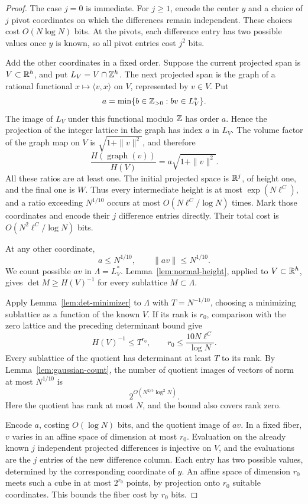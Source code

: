 \begin{proof}
The case \(j=0\) is immediate. For \(j\ge1\), encode the center \(y\)
and a choice of \(j\) pivot coordinates on which the differences remain
independent. These choices cost \(O(N\log N)\) bits. At the pivots,
each difference entry has two possible values once \(y\) is known, so
all pivot entries cost \(j^2\) bits.

Add the other coordinates in a fixed order. Suppose the current
projected span is \(V\subset\mathbb R^h\), and put \(L_V=V\cap\mathbb Z^h\). The next
projected span is the graph of a rational functional
\(x\mapsto\langle v,x\rangle\) on \(V\), represented by \(v\in V\). Put
\[
 a=\min\{b\in\mathbb Z_{>0}:bv\in L_V^*\}.
\]
The image of \(L_V\) under this functional modulo \(\mathbb Z\) has order
\(a\). Hence the projection of the integer lattice in the graph has
index \(a\) in \(L_V\). The volume factor of the graph map on \(V\) is
\(\sqrt{1+\|v\|^2}\), and therefore
\begin{equation}\label{eq:cube-height-ratio}
 \frac{H(\operatorname{graph}(v))}{H(V)}
       =a\sqrt{1+\|v\|^2}.
\end{equation}
All these ratios are at least one. The initial projected space is
\(\mathbb R^j\), of height one, and the final one is \(W\). Thus every
intermediate height is at most \(\exp(N\ell^C)\), and a ratio exceeding
\(N^{1/10}\) occurs at most \(O(N\ell^C/\log N)\) times. Mark those
coordinates and encode their \(j\) difference entries directly. Their
total cost is \(O(N^2\ell^C/\log N)\) bits.

At any other coordinate,
\[
 a\le N^{1/10},\qquad \|av\|\le N^{1/10}.
\]
We count possible \(av\) in \(\Lambda=L_V^*\).
Lemma~\ref{lem:normal-height}, applied to \(V\subset\mathbb R^h\), gives
\(\det M\ge H(V)^{-1}\) for every sublattice \(M\subset\Lambda\).

Apply Lemma~\ref{lem:det-minimizer} to \(\Lambda\) with
\(T=N^{-1/10}\), choosing a minimizing sublattice as a function of the
known \(V\). If its rank is \(r_0\), comparison with the zero lattice
and the preceding determinant bound give
\[
 H(V)^{-1}\le T^{r_0},\qquad
 r_0\le \frac{10N\ell^C}{\log N}.
\]
Every sublattice of the quotient has determinant at least \(T\) to
its rank. By Lemma~\ref{lem:gaussian-count}, the number of quotient
images of vectors of norm at most \(N^{1/10}\) is
\[
 2^{O(N^{2/5}\log^2N)}.
\]
Here the quotient has rank at most \(N\), and the bound also covers
rank zero.

Encode \(a\), costing \(O(\log N)\) bits, and the quotient image of
\(av\). In a fixed fiber, \(v\) varies in an affine space of dimension
at most \(r_0\). Evaluation on the already known \(j\) independent
projected differences is injective on \(V\), and the evaluations are
the \(j\) entries of the new difference column. Each entry has two
possible values, determined by the corresponding coordinate of \(y\).
An affine space of dimension \(r_0\) meets such a cube in at most
\(2^{r_0}\) points, by projection onto \(r_0\) suitable coordinates.
This bounds the fiber cost by \(r_0\) bits.


\end{proof}
